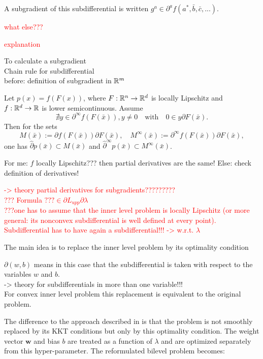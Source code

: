 A subgradient of this subdifferential is written \(g^{a} \in \partial^{a} f(a^*,\bar{b},\bar{c},...)\).

\textcolor{red}{what else???}

\textcolor{red}{explanation}





To calculate a subgradient \\
Chain rule for subdifferential \\
before: definition of subgradient in \(\mathbb{R}^m\)
\begin{theorem}
	Let \(p(x) = f(F(x))\), where \(F:\mathbb{R}^n \to \mathbb{R}^d\) is locally Lipschitz and \(f:\mathbb{R}^d \to \mathbb{R}\) is lower semicontinuous. 
	Assume \[\nexists y \in \partial^{\infty}f(F(\bar{x})), y \neq 0 \quad \text{with} \quad 0 \in y \partial F(\bar{x}). \]
	Then for the sets 
	\[ M(\bar{x}):= \partial f(F(\bar{x}))\partial F(\bar{x}), \quad M^{\infty}(\bar{x}):= \partial^{\infty}f(F(\bar{x}))\partial F(\bar{x}), \]
	one has \(\hat{\partial}p(\bar{x}) \subset M(\bar{x})\) and \(\hat{\partial}^{\infty} p(\bar{x}) \subset M^{\infty}(\bar{x})\).
\end{theorem}



For me: \(f\) locally Lipschitz??? then partial derivatives are the same! Else: check definition of derivatives!

\textcolor{red}{-> theory partial derivatives for subgradients????????? \\
??? Formula \(??? \in \partial L_{upp}{\partial \lambda}\) \\
???one has to assume that the inner level problem is locally Lipschitz (or more general: its nonconvex subdifferential is well defined at every point). \\
Subdifferential has to have again a subdifferential!!! -> w.r.t. \(\lambda\)}


The main idea is to replace the inner level problem by its optimality condition


\(\partial(w,b)\) means in this case that the subdifferential is taken with respect to the variables \(w\) and \(b\). \\
-> theory for subdifferentials in more than one variable!!! \\

For convex inner level problem this replacement is equivalent to the original problem.

The difference to the approach described in \cite{Kunapuli2008} is that the problem is not smoothly replaced by its KKT conditions but only by this optimality condition. The weight vector \(\bm{w}\) and bias \(b\) are treated as a function of \(\lambda\) and are optimized separately from this hyper-parameter.
The reformulated bilevel problem becomes:

